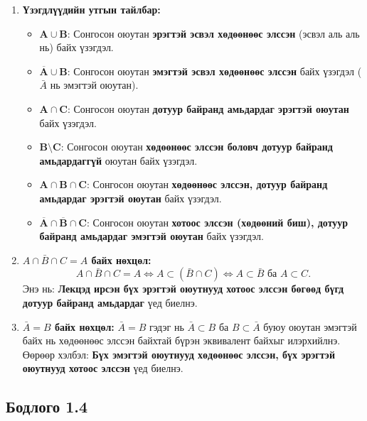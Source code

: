 \documentclass[11pt,a4paper]{article}
\begin{document}
\begin{enumerate}[label=\textbf{\arabic*.}, leftmargin=1.4em, itemsep=3pt]
  \item \textbf{Үзэгдлүүдийн утгын тайлбар:}
  \begin{itemize}[itemsep=2pt]
    \item $\mathbf{A \cup B}$: Сонгосон оюутан \textbf{эрэгтэй эсвэл хөдөөнөөс элссэн} (эсвэл аль аль нь) байх үзэгдэл.
    \item $\mathbf{\overline{A} \cup B}$: Сонгосон оюутан \textbf{эмэгтэй эсвэл хөдөөнөөс элссэн} байх үзэгдэл ($\bar{A}$ нь эмэгтэй оюутан).
    \item $\mathbf{A \cap C}$: Сонгосон оюутан \textbf{дотуур байранд амьдардаг эрэгтэй оюутан} байх үзэгдэл.
    \item $\mathbf{B \setminus C}$: Сонгосон оюутан \textbf{хөдөөнөөс элссэн боловч дотуур байранд амьдардаггүй} оюутан байх үзэгдэл.
    \item $\mathbf{A \cap B \cap C}$: Сонгосон оюутан \textbf{хөдөөнөөс элссэн, дотуур байранд амьдардаг эрэгтэй оюутан} байх үзэгдэл.
    \item $\mathbf{\overline{A} \cap \overline{B} \cap C}$: Сонгосон оюутан \textbf{хотоос элссэн (хөдөөний биш), дотуур байранд амьдардаг эмэгтэй оюутан} байх үзэгдэл.
  \end{itemize}

  \item \textbf{$A \cap \bar{B} \cap C = A$ байх нөхцөл:}
  \[
    A \cap \bar{B} \cap C = A \iff A \subset (\bar{B} \cap C) \iff A \subset \bar{B} \text{ ба } A \subset C.
  \]
  Энэ нь: \textbf{Лекцэд ирсэн бүх эрэгтэй оюутнууд хотоос элссэн бөгөөд бүгд дотуур байранд амьдардаг} үед биелнэ.

  \item \textbf{$\bar{A} = B$ байх нөхцөл:}
  $\bar{A} = B$ гэдэг нь $\bar{A} \subset B$ ба $B \subset \bar{A}$ буюу оюутан эмэгтэй байх нь хөдөөнөөс элссэн байхтай бүрэн эквивалент байхыг илэрхийлнэ.
  Өөрөөр хэлбэл: \textbf{Бүх эмэгтэй оюутнууд хөдөөнөөс элссэн, бүх эрэгтэй оюутнууд хотоос элссэн} үед биелнэ.
\end{enumerate}

\vspace{0.8em}

\subsection*{Бодлого 1.4}
\end{document}
